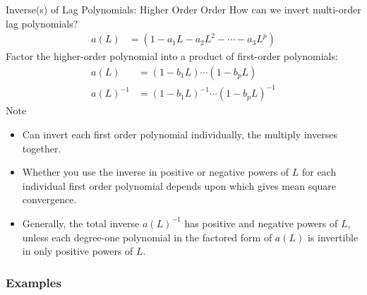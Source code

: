 \documentclass[aspectratio=169, handout]{beamer}
\begin{document}
{\footnotesize
\begin{frame}{Inverse(s) of Lag Polynomials: Higher Order Order}
How can we invert multi-order lag polynomials?
\begin{align*}
  a(L)
  &=
  (1-a_1L - a_2L^2 - \cdots - a_3L^p)
\end{align*}
\pause
\alert{Factor} the higher-order polynomial into a product of first-order
polynomials:
\begin{align*}
  a(L)
  &=
  (1-b_1L)
  \cdots
  (1-b_pL)
  \\
  a(L)^{-1}
  &=
  (1-b_1L)^{-1}
  \cdots
  (1-b_pL)^{-1}
\end{align*}
\pause
Note
\begin{itemize}
  \item Can invert each first order polynomial individually, the
    multiply inverses together.

  \pause
  \item Whether you use the inverse in \alert{positive} or
    \alert{negative} powers of $L$ for each individual first order
    polynomial depends upon which gives mean square convergence.

  \pause
  \item Generally, the total inverse $a(L)^{-1}$ has positive and
    negative powers of $L$, unless each degree-one polynomial in the
    factored form of $a(L)$ is invertible in only positive powers of
    $L$.
\end{itemize}


\end{frame}
}


\subsubsection{Examples}
\end{document}

